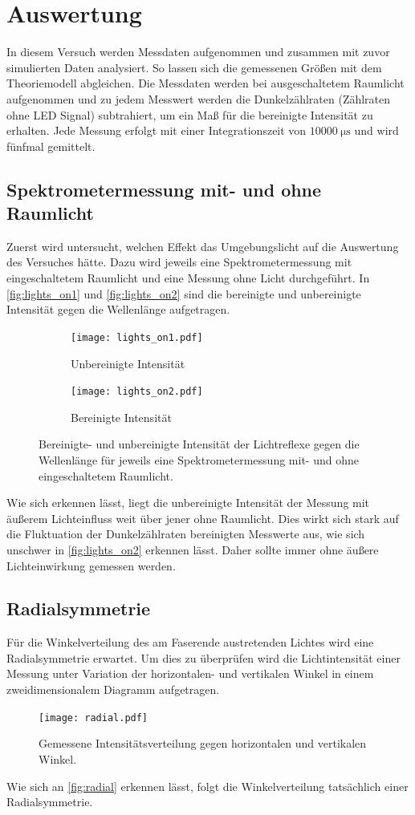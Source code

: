 \section{Auswertung}
\label{sec:Auswertung}
In diesem Versuch werden Messdaten aufgenommen und zusammen mit zuvor simulierten Daten analysiert. So lassen sich die gemessenen Größen mit dem Theoriemodell abgleichen.
Die Messdaten werden bei ausgeschaltetem Raumlicht aufgenommen und zu jedem Messwert werden die Dunkelzählraten (Zählraten ohne LED Signal) subtrahiert, um 
ein Maß für die bereinigte Intensität zu erhalten. Jede Messung erfolgt mit einer Integrationszeit von $\qty{10000}{\micro\second}$ und wird fünfmal gemittelt.

\subsection{Spektrometermessung mit- und ohne Raumlicht}
Zuerst wird untersucht, welchen Effekt das Umgebungslicht auf die Auswertung des Versuches hätte. Dazu wird jeweils eine Spektrometermessung mit eingeschaltetem Raumlicht 
und eine Messung ohne Licht durchgeführt. In \autoref{fig:lights_on1} und \autoref{fig:lights_on2} sind die bereinigte und unbereinigte Intensität gegen die Wellenlänge aufgetragen.
\begin{figure}
  \centering
  \begin{subfigure}{0.7\textwidth}
    \texttt{[image: lights\_on1.pdf]}
    \caption{Unbereinigte Intensität}
    \label{fig:lights_on1}
  \end{subfigure}
  \hfill
  \begin{subfigure}{0.7\textwidth}
    \texttt{[image: lights\_on2.pdf]}
    \caption{Bereinigte Intensität}
    \label{fig:lights_on2}
  \end{subfigure}
  \caption{Bereinigte- und unbereinigte Intensität der Lichtreflexe gegen die Wellenlänge für jeweils eine Spektrometermessung mit- und ohne eingeschaltetem Raumlicht.}
  \label{fig:lights_on}
\end{figure}
Wie sich erkennen lässt, liegt die unbereinigte Intensität der Messung mit äußerem Lichteinfluss weit über jener ohne Raumlicht. Dies wirkt sich stark auf die Fluktuation 
der Dunkelzählraten bereinigten Messwerte aus, wie sich unschwer in \autoref{fig:lights_on2} erkennen lässt. Daher sollte immer ohne äußere Lichteinwirkung gemessen werden.

\subsection{Radialsymmetrie}
Für die Winkelverteilung des am Faserende austretenden Lichtes wird eine Radialsymmetrie erwartet. Um dies zu überprüfen wird die Lichtintensität einer Messung unter Variation
der horizontalen- und vertikalen Winkel in einem zweidimensionalem Diagramm aufgetragen.
\begin{figure}
  \centering
  \texttt{[image: radial.pdf]}
  \caption{Gemessene Intensitätsverteilung gegen horizontalen und vertikalen Winkel.}
  \label{fig:radial}
\end{figure}
Wie sich an \autoref{fig:radial} erkennen lässt, folgt die Winkelverteilung tatsächlich einer Radialsymmetrie.

